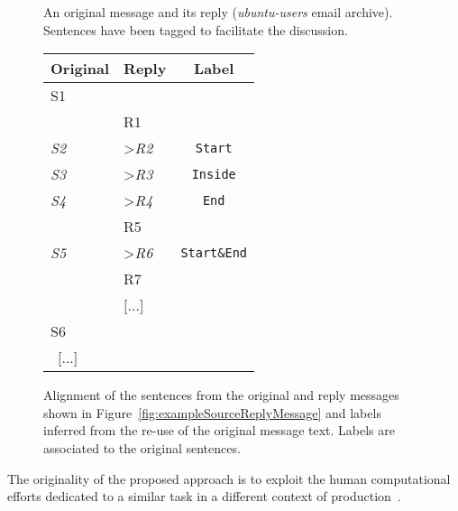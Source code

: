 \begin{figure}
\begin{minipage}{.46\textwidth}
        \caption{An original message and its reply (\textit{ubuntu-users} email archive). Sentences have been tagged to facilitate the discussion.}
        \label{fig:exampleSourceReplyMessage}
    \end{minipage}
    \hfill
    \begin{minipage}{.46\textwidth}
        \small\centering
        \begin{tabular}{*{2}{|l}|c|}
        \toprule
        \textbf{Original} & \textbf{Reply} & \textbf{Label}\\
        	\midrule
            S1  & & \\
            & R1 & \\
            \textit{S2}  & \textgreater \textit{R2}& \texttt{Start}\\
            \textit{S3}  & \textgreater \textit{R3}& \texttt{Inside}\\
            \textit{S4}  & \textgreater \textit{R4}& \texttt{End}\\
            & R5 & \\
            \textit{S5}  & \textgreater \textit{R6} & \texttt{Start\&End}\\
            & R7 & \\
            & [...] & \\
            S6    &  & \\ \ 
            [...] \    &  & \\
        	\bottomrule
        \end{tabular}
        \caption{Alignment of the sentences from the original and reply messages shown in Figure~\ref{fig:exampleSourceReplyMessage} and labels inferred from the re-use of the original message text. Labels are associated to the original sentences.}
        \label{fig:exampleSegmentationLabels}
    \end{minipage}
\end{figure}

The originality of the proposed approach is to exploit the human computational efforts dedicated to a similar task in a different context of production~\cite{ahn:2006:computer}. 

